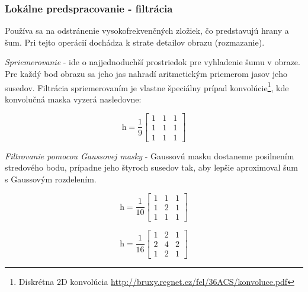 \subsubsection{Lokálne predspracovanie - filtrácia}
Používa sa na odstránenie vysokofrekvenčných zložiek, čo predstavujú hrany a šum. Pri tejto operácií dochádza k strate detailov obrazu (rozmazanie). \cite{Detekcia_a_rozpoznavanie_objektov}

\textit{Spriemerovanie} - ide o najjednoduchší prostriedok pre vyhladenie šumu v obraze. Pre každý bod obrazu sa jeho jas nahradí aritmetickým priemerom jasov jeho susedov. Filtrácia spriemerovaním je vlastne špeciálny prípad konvolúcie\footnote{Diskrétna 2D konvolúcia \url{http://bruxy.regnet.cz/fel/36ACS/konvoluce.pdf}}, kde konvolučná maska vyzerá nasledovne: \cite{Detekcia_a_rozpoznavanie_objektov}

\begin{equation}
    \textit{h}=\frac{1}{9}\begin{bmatrix} 1 & 1 & 1 \\ 1 & 1 & 1 \\ 1 & 1 & 1  \end{bmatrix}
\end{equation}

\textit{Filtrovanie pomocou Gaussovej masky} - Gaussovú masku dostaneme posilnením stredového bodu, prípadne jeho štyroch susedov tak, aby lepšie aproximoval šum s Gaussovým rozdelením. \cite{Detekcia_a_rozpoznavanie_objektov}


\begin{figure}[H]
    \centering
    \begin{minipage}[b]{0.49\textwidth}
        \begin{equation}
            \textit{h}=\frac{1}{10}\begin{bmatrix} 1 & 1 & 1 \\ 1 & 2 & 1 \\ 1 & 1 & 1  \end{bmatrix}
        \end{equation}
    \end{minipage}
    \hfill
    \begin{minipage}[b]{0.49\textwidth}
        \begin{equation}
            \textit{h}=\frac{1}{16}\begin{bmatrix} 1 & 2 & 1 \\ 2 & 4 & 2 \\ 1 & 2 & 1  \end{bmatrix}
        \end{equation}
    \end{minipage}
\end{figure}



